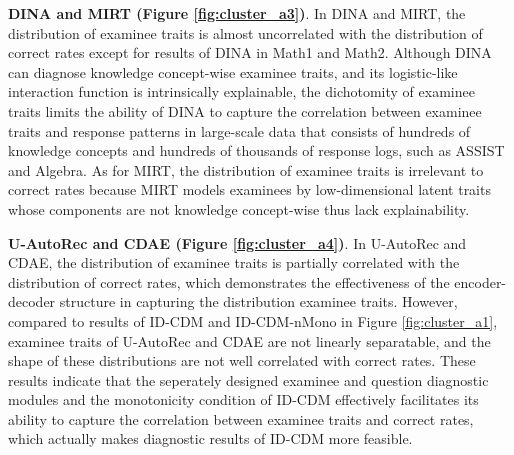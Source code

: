 \documentclass[sigconf]{acmart}
\begin{document}
\par \textbf{DINA and MIRT (Figure \ref{fig:cluster_a3})}. In DINA and MIRT, the distribution of examinee traits is almost uncorrelated with the distribution of correct rates except for results of DINA in Math1 and Math2. Although DINA can diagnose knowledge concept-wise examinee traits, and its logistic-like interaction function is intrinsically explainable, the dichotomity of examinee traits limits the ability of DINA to capture the correlation between examinee traits and response patterns in large-scale data that consists of hundreds of knowledge concepts and hundreds of thousands of response logs, such as ASSIST and Algebra. As for MIRT, the distribution of examinee traits is irrelevant to correct rates because MIRT models examinees by low-dimensional latent traits whose components are not knowledge concept-wise thus lack explainability.
\par \textbf{U-AutoRec and CDAE (Figure \ref{fig:cluster_a4})}. In U-AutoRec and CDAE, the distribution of examinee traits is partially correlated with the distribution of correct rates, which demonstrates the effectiveness of the encoder-decoder structure in capturing the distribution examinee traits. However, compared to results of ID-CDM and ID-CDM-nMono in Figure \ref{fig:cluster_a1}, examinee traits of U-AutoRec and CDAE are not linearly separatable, and the shape of these distributions are not well correlated with correct rates. These results indicate that the seperately designed examinee and question diagnostic modules and the monotonicity condition of ID-CDM effectively facilitates its ability to capture the correlation between examinee traits and correct rates, which actually makes diagnostic results of ID-CDM more feasible.


\begin{figure*}[hb]
  \centering
  

  \caption{Examinee traits clustering (Part 1). Each point denotes an examinee's traits, colored by his/her correct rate.}\label{fig:cluster_a1}
\end{figure*}

\begin{figure*}[hb]
  \centering

  
  \caption{Examinee traits clustering (Part 2). Each point denotes an examinee's traits, colored by his/her correct rate.}\label{fig:cluster_a2}
\end{figure*}
\end{document}
